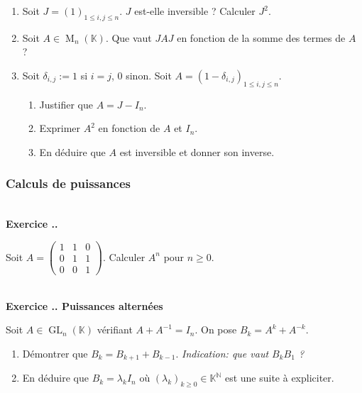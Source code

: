 \documentclass{article}
\newcommand{\mb}[1]{\mathbb{#1}}
\newcommand{\GL}{\operatorname{GL}}
\renewcommand{\M}{\operatorname{M}}
\newcounter{exo}
\newcommand{\exercice}[1][\null]{\textbf{\\ Exercice \thesection.\theexo. #1} \addtocounter{exo}{1}}
\begin{document}
\begin{enumerate}

\item Soit $J = (1)_{1 \le i,j \le n}$. $J$ est-elle inversible ? Calculer $J^2$.

\item Soit $A \in \M_n(\mb{K})$. Que vaut $JAJ$ en fonction de la somme des termes de $A$ ?

\item Soit $\delta_{i,j} := 1$ si $i = j$, $0$ sinon. Soit $A = (1 - \delta_{i,j})_{1 \le i,j \le n}$.

\begin{enumerate}
 \item Justifier que $A= J - I_n$.
 
 \item Exprimer $A^2$ en fonction de $A$ et $I_n$.
 
 \item En déduire que $A$ est inversible et donner son inverse.
 
 \end{enumerate}

\end{enumerate}



\subsubsection{Calculs de puissances}


\exercice

Soit $A = \begin{pmatrix} 1 & 1 & 0 \\ 0& 1& 1 \\ 0 &  0& 1 \end{pmatrix}$. Calculer $A^n$ pour $n \ge 0$.

\exercice[Puissances alternées]

Soit $A \in \GL_n(\mb{K})$ vérifiant $A + A^{-1} = I_n$. On pose $B_k = A^k + A^{-k} $.

\begin{enumerate}

\item Démontrer que $B_k = B_{k+1} +B_{k-1}$. \emph{Indication: que vaut $B_k B_1$ ?}

\item En déduire que $B_k = \lambda_k I_n$ où $(\lambda_k)_{k \ge 0} \in \mb{K}^{\mb{N}}$ est une suite à expliciter.

\end{enumerate}
\end{document}

